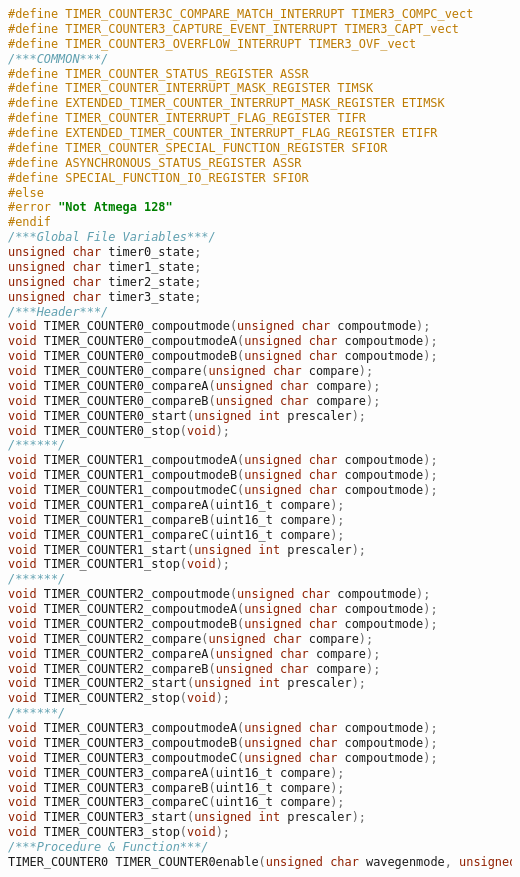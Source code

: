 \begin{lstlisting}[language=C, caption={atmega128timer.c}, label=atmega128timer-c, captionpos=b]
#define TIMER_COUNTER3C_COMPARE_MATCH_INTERRUPT TIMER3_COMPC_vect
#define TIMER_COUNTER3_CAPTURE_EVENT_INTERRUPT TIMER3_CAPT_vect
#define TIMER_COUNTER3_OVERFLOW_INTERRUPT TIMER3_OVF_vect
/***COMMON***/
#define TIMER_COUNTER_STATUS_REGISTER ASSR
#define TIMER_COUNTER_INTERRUPT_MASK_REGISTER TIMSK
#define EXTENDED_TIMER_COUNTER_INTERRUPT_MASK_REGISTER ETIMSK
#define TIMER_COUNTER_INTERRUPT_FLAG_REGISTER TIFR
#define EXTENDED_TIMER_COUNTER_INTERRUPT_FLAG_REGISTER ETIFR
#define TIMER_COUNTER_SPECIAL_FUNCTION_REGISTER SFIOR
#define ASYNCHRONOUS_STATUS_REGISTER ASSR
#define SPECIAL_FUNCTION_IO_REGISTER SFIOR
#else
#error "Not Atmega 128"
#endif
/***Global File Variables***/
unsigned char timer0_state;
unsigned char timer1_state;
unsigned char timer2_state;
unsigned char timer3_state;
/***Header***/
void TIMER_COUNTER0_compoutmode(unsigned char compoutmode);
void TIMER_COUNTER0_compoutmodeA(unsigned char compoutmode);
void TIMER_COUNTER0_compoutmodeB(unsigned char compoutmode);
void TIMER_COUNTER0_compare(unsigned char compare);
void TIMER_COUNTER0_compareA(unsigned char compare);
void TIMER_COUNTER0_compareB(unsigned char compare);
void TIMER_COUNTER0_start(unsigned int prescaler);
void TIMER_COUNTER0_stop(void);
/******/
void TIMER_COUNTER1_compoutmodeA(unsigned char compoutmode);
void TIMER_COUNTER1_compoutmodeB(unsigned char compoutmode);
void TIMER_COUNTER1_compoutmodeC(unsigned char compoutmode);
void TIMER_COUNTER1_compareA(uint16_t compare);
void TIMER_COUNTER1_compareB(uint16_t compare);
void TIMER_COUNTER1_compareC(uint16_t compare);
void TIMER_COUNTER1_start(unsigned int prescaler);
void TIMER_COUNTER1_stop(void);
/******/
void TIMER_COUNTER2_compoutmode(unsigned char compoutmode);
void TIMER_COUNTER2_compoutmodeA(unsigned char compoutmode);
void TIMER_COUNTER2_compoutmodeB(unsigned char compoutmode);
void TIMER_COUNTER2_compare(unsigned char compare);
void TIMER_COUNTER2_compareA(unsigned char compare);
void TIMER_COUNTER2_compareB(unsigned char compare);
void TIMER_COUNTER2_start(unsigned int prescaler);
void TIMER_COUNTER2_stop(void);
/******/
void TIMER_COUNTER3_compoutmodeA(unsigned char compoutmode);
void TIMER_COUNTER3_compoutmodeB(unsigned char compoutmode);
void TIMER_COUNTER3_compoutmodeC(unsigned char compoutmode);
void TIMER_COUNTER3_compareA(uint16_t compare);
void TIMER_COUNTER3_compareB(uint16_t compare);
void TIMER_COUNTER3_compareC(uint16_t compare);
void TIMER_COUNTER3_start(unsigned int prescaler);
void TIMER_COUNTER3_stop(void);
/***Procedure & Function***/
TIMER_COUNTER0 TIMER_COUNTER0enable(unsigned char wavegenmode, unsigned char interrupt)

\end{lstlisting}
